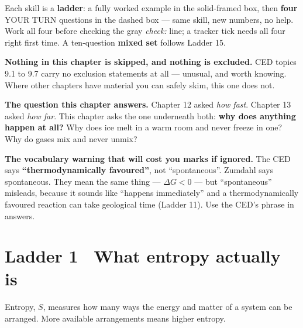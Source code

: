 \documentclass{apchem-worksheet}
\begin{document}
\apctitleblock

\begin{apcnote}
Each skill is a \textbf{ladder}: a fully worked example in the
solid-framed box, then \textbf{four} YOUR TURN questions in the dashed
box --- same skill, new numbers, no help. Work all four before checking
the gray \emph{check:} line; a tracker tick needs all four right first
time. A ten-question \textbf{mixed set} follows Ladder 15.

\textbf{Nothing in this chapter is skipped, and nothing is excluded.}
CED topics 9.1 to 9.7 carry no exclusion statements at all --- unusual,
and worth knowing. Where other chapters have material you can safely
skim, this one does not.

\textbf{The question this chapter answers.} Chapter 12 asked
\emph{how fast}. Chapter 13 asked \emph{how far}. This chapter asks the
one underneath both: \textbf{why does anything happen at all?} Why does
ice melt in a warm room and never freeze in one? Why do gases mix and
never unmix?

\textbf{The vocabulary warning that will cost you marks if ignored.}
The CED says \textbf{``thermodynamically favoured''}, not
``spontaneous''. Zumdahl says spontaneous. They mean the same thing ---
$\Delta G < 0$ --- but ``spontaneous'' misleads, because it sounds like
``happens immediately'' and a thermodynamically favoured reaction can
take geological time (Ladder 11). Use the CED's phrase in answers.
\end{apcnote}

\section*{\sffamily Ladder 1 \textbullet\ What entropy actually is}

Entropy, $S$, measures how many ways the energy and matter of a system
can be arranged. More available arrangements means higher entropy.
\end{document}
